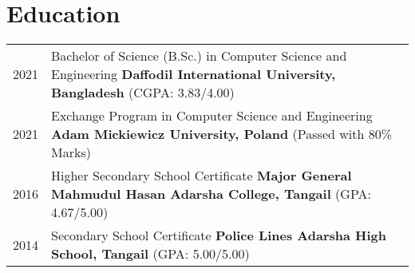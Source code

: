 \section{\textbf{Education}}
\begin{tabularx}{\linewidth}{@{}l X@{}}
    2021 & Bachelor of Science (B.Sc.) in Computer Science
    and Engineering
    \newline
    \textbf{Daffodil International University, Bangladesh} \hfill (CGPA: 3.83/4.00)
    \\

    2021 & Exchange Program in Computer Science and Engineering
    \newline
    \textbf{Adam Mickiewicz University, Poland} \hfill (Passed with 80\% Marks)
    \\

    2016 & Higher Secondary School Certificate
    \newline
    \textbf{Major General Mahmudul Hasan Adarsha College, Tangail} \hfill (GPA:
    4.67/5.00) \\

    2014 & Secondary School Certificate
    \newline
    \textbf{Police Lines Adarsha High School, Tangail} \hfill (GPA: 5.00/5.00)
    \\
\end{tabularx}
